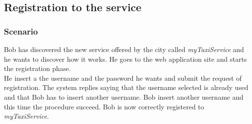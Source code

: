 \subsection{Registration to the service}
\subsubsection{Scenario}
Bob has discovered the new service offered by the city called \textit{myTaxiService} and he wants to discover how it works. He goes to the web application site and starts the registration phase.\\
He insert a the username and the password he wants and submit the request of registration. The system replies saying that the username selected is already used and that Bob has to insert another username. Bob insert another username and this time the procedure succeed. Bob is now correctly registered to \textit{myTaxiService}.
